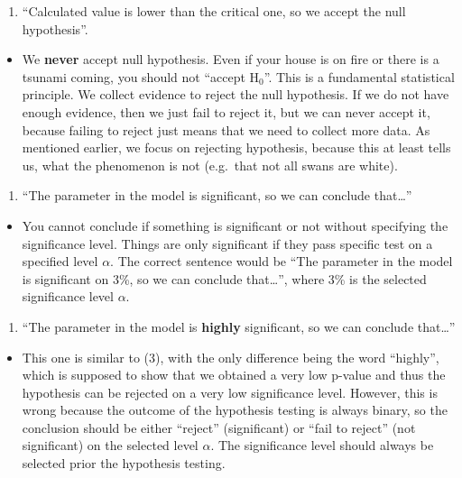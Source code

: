 \documentclass[
]{book}
\providecommand{\tightlist}{%
  \setlength{\itemsep}{0pt}\setlength{\parskip}{0pt}}
\theoremstyle{definition}
\theoremstyle{definition}
\theoremstyle{definition}
\theoremstyle{definition}
\theoremstyle{remark}
\begin{document}
\begin{enumerate}
\def\labelenumi{\arabic{enumi}.}
\setcounter{enumi}{1}
\tightlist
\item
  ``Calculated value is lower than the critical one, so we accept the null hypothesis''.
\end{enumerate}

\begin{itemize}
\tightlist
\item
  We \textbf{never} accept null hypothesis. Even if your house is on fire or there is a tsunami coming, you should not ``accept \(\mathrm{H}_0\)''. This is a fundamental statistical principle. We collect evidence to reject the null hypothesis. If we do not have enough evidence, then we just fail to reject it, but we can never accept it, because failing to reject just means that we need to collect more data. As mentioned earlier, we focus on rejecting hypothesis, because this at least tells us, what the phenomenon is not (e.g.~that not all swans are white).
\end{itemize}

\begin{enumerate}
\def\labelenumi{\arabic{enumi}.}
\setcounter{enumi}{2}
\tightlist
\item
  ``The parameter in the model is significant, so we can conclude that\ldots{}''
\end{enumerate}

\begin{itemize}
\tightlist
\item
  You cannot conclude if something is significant or not without specifying the significance level. Things are only significant if they pass specific test on a specified level \(\alpha\). The correct sentence would be ``The parameter in the model is significant on 3\%, so we can conclude that\ldots{}'', where 3\% is the selected significance level \(\alpha\).
\end{itemize}

\begin{enumerate}
\def\labelenumi{\arabic{enumi}.}
\setcounter{enumi}{3}
\tightlist
\item
  ``The parameter in the model is \textbf{highly} significant, so we can conclude that\ldots{}''
\end{enumerate}

\begin{itemize}
\tightlist
\item
  This one is similar to (3), with the only difference being the word ``highly'', which is supposed to show that we obtained a very low p-value and thus the hypothesis can be rejected on a very low significance level. However, this is wrong because the outcome of the hypothesis testing is always binary, so the conclusion should be either ``reject'' (significant) or ``fail to reject'' (not significant) on the selected level \(\alpha\). The significance level should always be selected prior the hypothesis testing.
\end{itemize}
\end{document}

